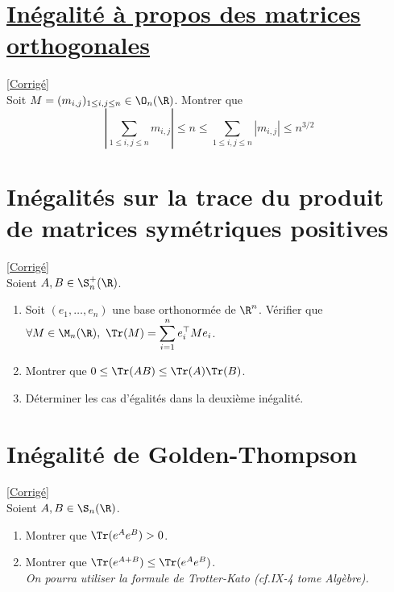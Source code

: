 \documentclass[8pt]{book}
\begin{document}
\section{\underline{Inégalité à propos des matrices orthogonales} }
\label{Inégalité à propos des matrices orthogonales}
\textcolor{blue}{\hyperref[Inégalité à propos des matrices orthogonales corrigé]{[Corrigé]}}\\
Soit $M=(m_{i,j})_{1\leq i,j\leq n}\in \O_n(\R)$. Montrer que
$$\left|\sum_{1\leq i,j\leq n}m_{i,j}\right|\leq n \leq\sum_{1\leq i,j\leq n}|m_{i,j}|\leq n^{3/2}$$

\section{Inégalités sur la trace du produit de matrices symétriques positives }
\label{Inégalités sur la trace du produit de matrices symétriques positives}
\textcolor{blue}{\hyperref[Inégalités sur la trace du produit de matrices symétriques positives corrigé]{[Corrigé]}}\\
Soient $A,B\in\S_n^+(\R)$.
\begin{enumerate}
	\item Soit $(e_1,\dots,e_n)$ une base orthonormée de $\R^n$. Vérifier que $\forall M\in \M_n(\R),\ \Tr(M)=\displaystyle\sum_{i=1}^ne_i^\top Me_i$.
	\item Montrer que $0\leq\Tr(AB)\leq\Tr(A)\Tr(B)$.
	\item Déterminer les cas d'égalités dans la deuxième inégalité.
\end{enumerate}

\section{Inégalité de Golden-Thompson }
\label{Inégalité de Golden-Thompson}
\textcolor{blue}{\hyperref[Inégalité de Golden-Thompson corrigé]{[Corrigé]}}\\
Soient $A,B\in \S_n(\R)$.
\begin{enumerate}
	\item Montrer que $\Tr(e^Ae^B)>0$.
	\item Montrer que $\Tr(e^{A+B})\leq \Tr(e^Ae^B)$.\\
	\textit{On pourra utiliser la formule de Trotter-Kato (cf.IX-4 tome Algèbre).}
\end{enumerate}
\end{document}

